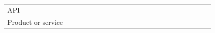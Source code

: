 \documentclass[english, 12pt, a4paper, sci, utf8, a-1b, online]{aaltothesis}
\begin{document}
{\begin{center}
\begin{longtable}{p{0.3\linewidth}p{0.6\linewidth}}
      API                               & \textcite{nebeling2013informing} \newline \textcite{api-designers} \newline \textcite{pinter2019polymorph} \newline \textcite{dong2019impact} \newline \textcite{myers2016improving} \newline \textcite{macvean2016api} \newline \textcite{programmer-experience} \newline \textcite{ollis2019helping}                                                                                                                                                                                                                                                                                                                                                                                                                                                                                                                                          \\
      Product or service                & \textcite{api-designers} \newline \textcite{pinter2019polymorph} \newline \textcite{miranda2018improving} \newline \textcite{fontao2016mseco} \newline \textcite{myers2016improving} \newline \textcite{macvean2016api} \newline \textcite{kuusinen2016software}  \newline \textcite{claussen2019role}                                                                                                                                                                                                                                                                                                                                                                                                                                                                                                                                          \\

\end{longtable}
\end{center}}
\end{document}
